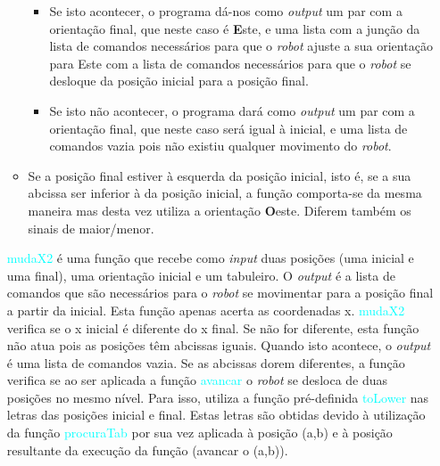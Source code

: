 \documentclass[12pt,a4paper]{article}
\begin{document}
\begin{itemize}
\begin{itemize}
\begin{itemize}
\item \textsf{Se isto acontecer, o programa dá-nos como \textit{output} um par com a orienta\c{c}ão final, que neste caso é \textbf{E}ste, e uma lista com a jun\c{c}ão da lista de comandos necessários para que o \textit{robot} ajuste a sua orienta\c{c}ão para Este com a lista de comandos necessários para que o \textit{robot} se desloque da posi\c{c}ão inicial para a posi\c{c}ão final.}
\item \textsf{Se isto não acontecer, o programa dará como \textit{output} um par com a orienta\c{c}ão final, que neste caso será igual à inicial, e uma lista de comandos vazia pois não existiu qualquer movimento do \textit{robot}.}
\end{itemize}
\item \textsf{Se a posi\c{c}ão final estiver à esquerda da posi\c{c}ão inicial, isto é, se a sua abcissa ser inferior à da posi\c{c}ão inicial, a fun\c{c}ão comporta-se da mesma maneira mas desta vez utiliza a orienta\c{c}ão \textbf{O}este. Diferem também os sinais de maior/menor.}
\end{itemize}




\textsf{ \indent \textcolor{cyan}{mudaX2} é uma fun\c{c}ão que recebe como \textit{input} duas posi\c{c}ões (uma inicial e uma final), uma orienta\c{c}ão inicial e um tabuleiro. O \textit{output} é a lista de comandos que são necessários para o \textit{robot} se movimentar para a posi\c{c}ão final a partir da inicial. Esta fun\c{c}ão apenas acerta as coordenadas x. \textcolor{cyan}{mudaX2} verifica se o x inicial é diferente do x final. Se não for diferente, esta fun\c{c}ão não atua pois as posi\c{c}ões têm abcissas iguais. Quando isto acontece, o \textit{output} é uma lista de comandos vazia.}
\newline\textsf{\indent Se as abcissas dorem diferentes, a fun\c{c}ão verifica se ao ser aplicada a fun\c{c}ão \textcolor{cyan}{avancar} o \textit{robot} se desloca de duas posi\c{c}ões no mesmo nível. Para isso, utiliza a fun\c{c}ão pré-definida \textcolor{cyan}{toLower} nas letras das posi\c{c}ões inicial e final. Estas letras são obtidas devido à utiliza\c{c}ão da fun\c{c}ão \textcolor{cyan}{procuraTab} por sua vez aplicada à posi\c{c}ão (a,b) e à posi\c{c}ão resultante da execu\c{c}ão da fun\c{c}ão (avancar o (a,b)).}


\end{itemize}
\end{document}
